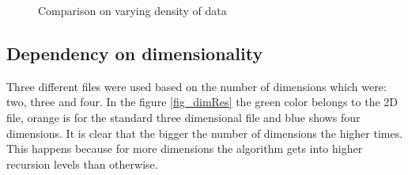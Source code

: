 \begin{figure}
\begin{minipage}{.5\linewidth}
\centering
{}
\end{minipage}%
\begin{minipage}{.5\linewidth}
\centering
{}
\end{minipage}\par\medskip

\caption{Comparison on varying density of data}
\label{fig_densRes}
\end{figure}

\subsection{Dependency on dimensionality}
Three different files were used based on the number of dimensions which were: two, three and four. In the figure \ref{fig_dimRes} the green color belongs to the 2D file, orange is for the standard three dimensional file and blue shows four dimensions. It is clear that the bigger the number of dimensions the higher times. This happens because for more dimensions the algorithm gets into higher recursion levels than otherwise.

